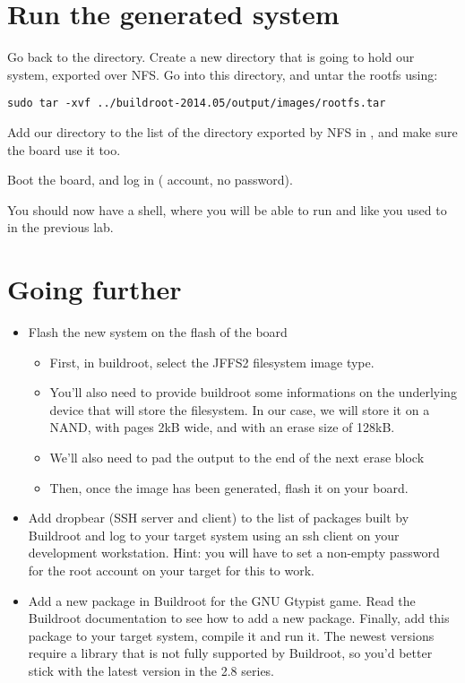 \section{Run the generated system}

Go back to the  directory. Create
a new directory  that is going to hold our system,
exported over NFS. Go into this directory, and untar the rootfs using:

\begin{verbatim}
sudo tar -xvf ../buildroot-2014.05/output/images/rootfs.tar
\end{verbatim}

Add our  directory to the list of the directory exported
by NFS in , and make sure the board use it too.

Boot the board, and log in ( account, no password).

You should now have a shell, where you will be able to run
 and  like you used to in the previous
lab.

\section{Going further}

\begin{itemize}

\item Flash the new system on the flash of the board
  \begin{itemize}
  \item First, in buildroot, select the JFFS2 filesystem image type.
  \item You'll also need to provide buildroot some informations on the
    underlying device that will store the filesystem. In our case, we
    will store it on a NAND, with pages 2kB wide, and with an erase
    size of 128kB.
  \item We'll also need to pad the output to the end of the next erase
    block
  \item Then, once the image has been generated, flash it on your
    board.
  \end{itemize}

\item Add dropbear (SSH server and client) to the list of packages
  built by Buildroot and log to your target system using an ssh client
  on your development workstation. Hint: you will have to set a
  non-empty password for the root account on your target for this to
  work.

\item Add a new package in Buildroot for the GNU Gtypist game. Read
  the Buildroot documentation to see how to add a new
  package. Finally, add this package to your target system, compile it
  and run it. The newest versions require a library that is not fully
  supported by Buildroot, so you'd better stick with the latest
  version in the 2.8 series.

\end{itemize}
